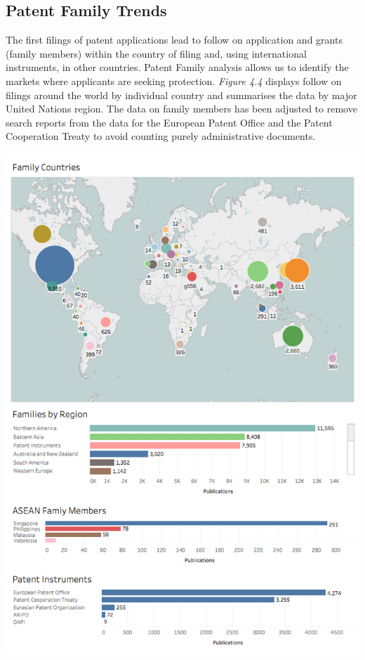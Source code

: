 \documentclass[]{book}
\theoremstyle{definition}
\theoremstyle{definition}
\theoremstyle{definition}
\theoremstyle{remark}
\begin{document}
\hypertarget{patent-family-trends}{%
\subsection{Patent Family Trends}\label{patent-family-trends}}

The first filings of patent applications lead to follow on application
and grants (family members) within the country of filing and, using
international instruments, in other countries. Patent Family analysis
allows us to identify the markets where applicants are seeking
protection. \emph{Figure 4.4} displays follow on filings around the
world by individual country and summarises the data by major United
Nations region. The data on family members has been adjusted to remove
search reports from the data for the European Patent Office and the
Patent Cooperation Treaty to avoid counting purely administrative
documents.

\includegraphics[width=11.49in]{images-patents/families}
\end{document}
